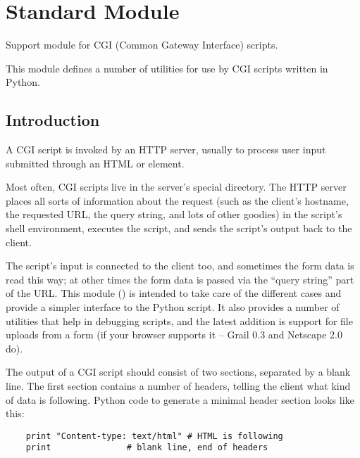 \section{Standard Module }

\renewcommand{\indexsubitem}{(in module cgi)}

Support module for CGI (Common Gateway Interface) scripts.

This module defines a number of utilities for use by CGI scripts
written in Python.

\subsection{Introduction}

A CGI script is invoked by an HTTP server, usually to process user
input submitted through an HTML  or  element.

Most often, CGI scripts live in the server's special 
directory.  The HTTP server places all sorts of information about the
request (such as the client's hostname, the requested URL, the query
string, and lots of other goodies) in the script's shell environment,
executes the script, and sends the script's output back to the client.

The script's input is connected to the client too, and sometimes the
form data is read this way; at other times the form data is passed via
the ``query string'' part of the URL.  This module () is intended
to take care of the different cases and provide a simpler interface to
the Python script.  It also provides a number of utilities that help
in debugging scripts, and the latest addition is support for file
uploads from a form (if your browser supports it -- Grail 0.3 and
Netscape 2.0 do).

The output of a CGI script should consist of two sections, separated
by a blank line.  The first section contains a number of headers,
telling the client what kind of data is following.  Python code to
generate a minimal header section looks like this:

\begin{verbatim}
	print "Content-type: text/html"	# HTML is following
	print				# blank line, end of headers
\end{verbatim}


